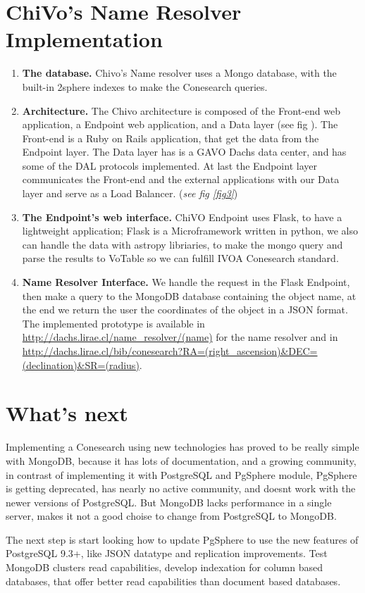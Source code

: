 \documentclass[11pt,twoside]{article}
\begin{document}
\section{ChiVo's Name Resolver Implementation}
\begin{enumerate}

\item  \textbf{The database.} Chivo's Name resolver uses a Mongo database, with the built-in 2sphere indexes 
to make the Conesearch queries. 

\item  \textbf{Architecture.}  The Chivo architecture is composed of the Front-end web application, a Endpoint web application,
and a Data layer (see fig ). The Front-end is a Ruby on Rails application, that get the data from the Endpoint layer. 
The Data layer has is a GAVO Dachs data center, and has some of the DAL protocols implemented.
At last the Endpoint layer communicates the Front-end and the external applications with our Data layer and serve as a Load Balancer. (\emph{see fig \ref{fig3}})


\item  \textbf{The Endpoint’s web interface.} ChiVO Endpoint uses Flask, to have a lightweight application; 
Flask is a Microframework written in python, we also can handle the data with astropy
libriaries, to make the mongo query and parse the results to VoTable so we can fulfill IVOA Conesearch standard.

\item \textbf{Name Resolver Interface.} We handle the request in the Flask Endpoint,
then make a query to the MongoDB database containing the object name, at the end we return the user the coordinates of the object 
in a JSON format. The implemented prototype is available in \url{http://dachs.lirae.cl/name_resolver/(name)} for the name resolver
and in \url{http://dachs.lirae.cl/bib/conesearch?RA=(right_ascension)&DEC=(declination)&SR=(radius)}.

\end{enumerate}

\section{What's next}
    Implementing a Conesearch using new technologies has proved to be really simple with MongoDB, because it has lots of documentation, 
and a growing community, in contrast of implementing it with PostgreSQL and PgSphere module, PgSphere is getting deprecated, has nearly no active
community, and doesnt work with the newer versions of PostgreSQL. But MongoDB lacks performance in a single server, makes it not a good choise to change from PostgreSQL to MongoDB.

  The next step is start looking how to update PgSphere to use the new features of PostgreSQL 9.3+, like JSON datatype and replication improvements.
Test MongoDB clusters read capabilities, develop indexation for column based databases, that offer better read capabilities than document based databases.

\end{document}
